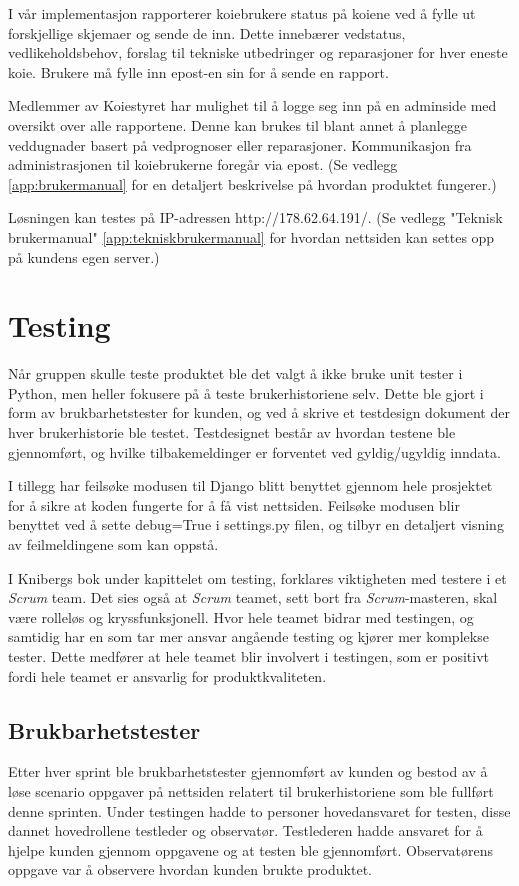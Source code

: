 \documentclass[12pt,a4paper,norsk]{article}
\begin{document}
  I vår implementasjon rapporterer koiebrukere status på koiene ved å fylle ut forskjellige skjemaer og sende de inn. Dette innebærer vedstatus, vedlikeholdsbehov, forslag til tekniske utbedringer og reparasjoner for hver eneste koie. Brukere må fylle inn epost-en sin for å sende en rapport.

  Medlemmer av Koiestyret har mulighet til å logge seg inn på en adminside med oversikt over alle rapportene. Denne kan brukes til blant annet å planlegge veddugnader basert på vedprognoser eller reparasjoner. Kommunikasjon fra administrasjonen til koiebrukerne foregår via epost. (Se vedlegg \cref{app:brukermanual}  for en detaljert beskrivelse på hvordan produktet fungerer.)

  Løsningen kan testes på IP-adressen http://178.62.64.191/. (Se vedlegg "Teknisk brukermanual" \cref{app:tekniskbrukermanual} for hvordan nettsiden kan settes opp på kundens egen server.)

  \section{Testing}

Når gruppen skulle teste produktet ble det valgt å ikke bruke unit tester i Python, men heller fokusere på å teste brukerhistoriene selv. Dette ble gjort i form av brukbarhetstester for kunden, og ved å skrive et testdesign dokument der hver brukerhistorie ble testet. Testdesignet består av hvordan testene ble gjennomført, og hvilke tilbakemeldinger er forventet ved gyldig/ugyldig inndata.

I tillegg har feilsøke modusen til Django blitt benyttet gjennom hele prosjektet for å sikre at koden fungerte for å få vist nettsiden. Feilsøke modusen blir benyttet ved å sette debug=True i settings.py filen, og tilbyr en detaljert visning av feilmeldingene som kan oppstå.

I Knibergs bok under kapittelet om testing\cite[side 128-131]{kniberg}, forklares viktigheten med testere i et \textit{Scrum} team. Det sies også at \textit{Scrum} teamet, sett bort fra \textit{Scrum}-masteren, skal være rolleløs og kryssfunksjonell. Hvor hele teamet bidrar med testingen, og samtidig har en som tar mer ansvar angående testing og kjører mer komplekse tester. Dette medfører at hele teamet blir involvert i testingen, som er positivt fordi hele teamet er ansvarlig for produktkvaliteten.

 \subsection{Brukbarhetstester}
Etter hver sprint ble brukbarhetstester gjennomført av kunden og bestod av å løse scenario oppgaver på nettsiden relatert til brukerhistoriene som ble fullført denne sprinten. Under testingen hadde to personer hovedansvaret for testen, disse dannet hovedrollene testleder og observatør. Testlederen hadde ansvaret for å hjelpe kunden gjennom oppgavene og at testen ble gjennomført. Observatørens oppgave var å observere hvordan kunden brukte produktet.
\end{document}
